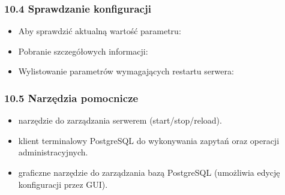 \documentclass[a4paper,11pt,openany,english]{sphinxmanual}
\begin{document}
\subsubsection{10.4 Sprawdzanie konfiguracji}
\label{\detokenize{rozdzial2/Konfiguracja_baz_danych/Konfiguracja_baz_danych:sprawdzanie-konfiguracji}}\begin{itemize}
\item {} 
\sphinxAtStartPar
Aby sprawdzić aktualną wartość parametru:

\begin{sphinxVerbatim}[commandchars=\\\{\}]
 
\end{sphinxVerbatim}

\item {} 
\sphinxAtStartPar
Pobranie szczegółowych informacji:

\begin{sphinxVerbatim}[commandchars=\\\{\}]
     
 
   
\end{sphinxVerbatim}

\item {} 
\sphinxAtStartPar
Wylistowanie parametrów wymagających restartu serwera:

\begin{sphinxVerbatim}[commandchars=\\\{\}]
       
\end{sphinxVerbatim}

\end{itemize}


\subsubsection{10.5 Narzędzia pomocnicze}
\label{\detokenize{rozdzial2/Konfiguracja_baz_danych/Konfiguracja_baz_danych:narzedzia-pomocnicze}}\begin{itemize}
\item {} 
\sphinxAtStartPar
{} \textendash{} narzędzie do zarządzania serwerem (start/stop/reload).

\item {} 
\sphinxAtStartPar
{} \textendash{} klient terminalowy PostgreSQL do wykonywania zapytań oraz operacji administracyjnych.

\item {} 
\sphinxAtStartPar
{} \textendash{} graficzne narzędzie do zarządzania bazą PostgreSQL (umożliwia edycję konfiguracji przez GUI).

\end{itemize}
\end{document}
